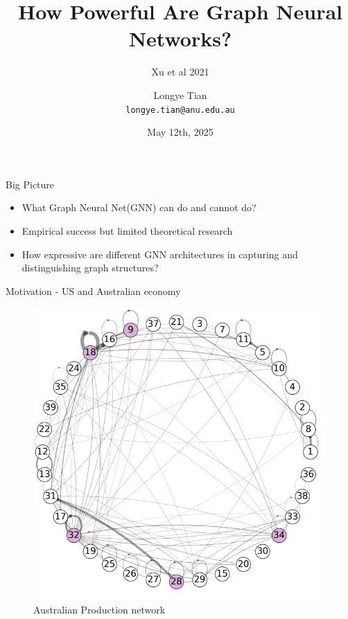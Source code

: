 \documentclass[aspectratio=169]{beamer} %
\title[GNN]{How Powerful Are Graph Neural Networks?}
\subtitle{Xu et al 2021}
\author[Longye]{Longye Tian \\ \texttt{longye.tian@anu.edu.au}}
\institute[ANU]{Australian National University\\ School of Economics}
\date{May 12th, 2025}
\begin{document}
\begin{frame}
  \titlepage
\end{frame}

\begin{frame}{Big Picture}
    \begin{itemize}
        \item What Graph Neural Net(GNN) can do and cannot do?
        \item Empirical success but limited theoretical research
        \item How expressive are different GNN architectures in capturing and distinguishing graph structures?
    \end{itemize}
\end{frame}

\begin{frame}{Motivation - US and Australian economy}
\begin{figure}
    \centering
    \includegraphics[width=0.5\linewidth]{Network/Graph Neural Network/au-net.png}
    \caption{Australian Production network}
\end{figure}
\end{frame}
\end{document}
